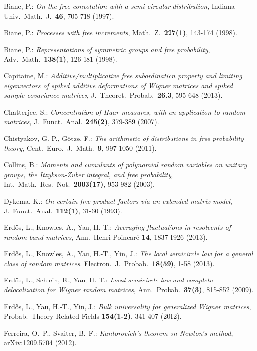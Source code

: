 \documentclass[10pt,reqno]{amsart}
\numberwithin{equation}{section}
\theoremstyle{plain}
\numberwithin{kevin}{section}
\theoremstyle{remark}
\begin{document}
\begin{thebibliography}{00}
 Biane, P.: \emph{On the free convolution with a semi-circular distribution}, Indiana Univ.\ Math.\ J.\ \textbf{46}, 705-718 (1997).

 Biane, P.: \emph{Processes with free increments}, Math.\ Z.\ \textbf{227(1)}, 143-174 (1998).

Biane, P.: \emph{Representations of symmetric groups and free probability}, Adv.\ Math.\ \textbf{138(1)}, 126-181 (1998).

 Capitaine, M.: \emph{ Additive/multiplicative free subordination property and limiting eigenvectors of spiked additive deformations of Wigner matrices and spiked sample covariance matrices},  J.\ Theoret.\ Probab.\ \textbf{26.3}, 595-648 (2013).

 Chatterjee, S.: \emph{Concentration of Haar measures, with an application to random matrices},  J.\ Funct.\ Anal.\  \textbf{245(2)}, 379-389 (2007).

 Chistyakov, G. P., G\"{o}tze, F.: \emph{The arithmetic of distributions in free probability theory}, Cent.\ Euro.\ J.\
Math.\ \textbf{9}, 997-1050 (2011). 

  Collins, B.: \emph{Moments and cumulants of polynomial random variables on unitary
groups, the Itzykson-Zuber integral, and free probability}, Int.\ Math.\ Res.\ Not.\  \textbf{2003(17)}, 953-982 (2003).

 Dykema, K.: \emph{On certain free product factors via an extended matrix model},  J.\ Funct.\ Anal.\  \textbf{112(1)}, 31-60 (1993).

 Erd\H{o}s, L., Knowles, A., Yau, H.-T.: \emph{Averaging fluctuations in resolvents of random band matrices}, Ann.\ Henri Poincar\'{e} \textbf{14}, 1837-1926 (2013). 

 Erd\H{o}s, L., Knowles, A., Yau, H.-T., Yin, J.: \emph{The local semicircle law for a general class of random matrices}. Electron.\ J.\ Probab.\  \textbf{18(59)}, 1-58 (2013). 

 Erd\H{o}s, L.,  Schlein, B., Yau, H.-T.: \emph{Local semicircle law and complete delocalization for
Wigner random matrices}, Ann.\ Probab.\ \textbf{37(3)}, 815-852 (2009).

 Erd\H{o}s, L., Yau, H.-T., Yin, J.: \emph{Bulk universality for generalized Wigner matrices}, Probab.\ Theory Related Fields \textbf{154(1-2)}, 341-407 (2012).

 Ferreira, O.\ P., Svaiter, B.\ F.: \emph{Kantorovich's theorem on Newton's method}, arXiv:1209.5704 (2012).


\end{thebibliography}
\end{document}
